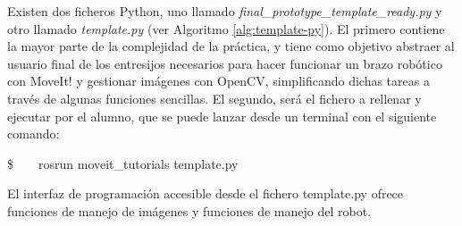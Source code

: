 \documentclass[12pt,spanish,chapterprefix, numbers=noenddot]{book}
\numberwithin{equation}{section}
\numberwithin{figure}{section}
\begin{document}
Existen dos ficheros Python, uno llamado \textit{final\_prototype\_template\_ready.py} y otro llamado \textit{template.py} (ver Algoritmo \ref{alg:template-py}). 
El primero contiene la mayor parte de la complejidad de la práctica, y tiene como objetivo abstraer al usuario final de los entresijos necesarios para hacer funcionar un brazo robótico con MoveIt! y gestionar imágenes con OpenCV, simplificando dichas tareas a través de algunas funciones sencillas. El segundo, será el fichero a rellenar y ejecutar por el alumno, que se puede lanzar desde un terminal con el siguiente comando: 

\$\ \ \ \ rosrun moveit\_tutorials template.py
    
El interfaz de programación accesible desde el fichero template.py ofrece funciones de manejo de imágenes y funciones de manejo del robot. 
\end{document}
